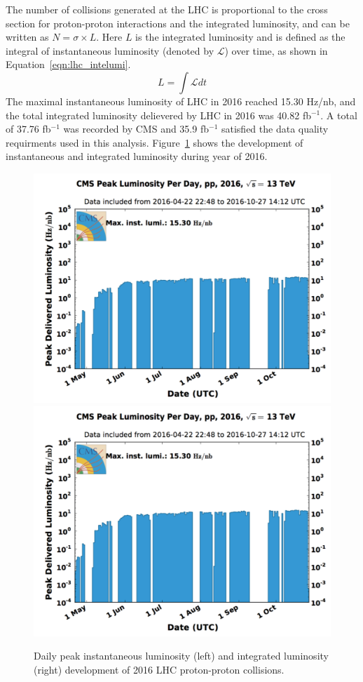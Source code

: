 \vspace{0.3cm}
The number of collisions generated at the LHC is proportional to the cross section for proton-proton interactions and the integrated luminosity, and can be written as $N=\sigma \times L$. Here $L$ is the integrated luminosity and is defined as the integral of instantaneous luminosity (denoted by $\mathcal{L}$) over time, as shown in Equation~\ref{eqn:lhc_intelumi}.
\begin{equation}
L=\int \mathcal{L}dt
\label{eqn:lhc_intelumi}
\end{equation}
The maximal instantaneous luminosity of LHC in 2016 reached 15.30 Hz/nb, and the total integrated luminosity delievered by LHC in 2016 was 40.82 fb$^{-1}$. A total of 37.76 fb$^{-1}$ was recorded by CMS and 35.9 fb$^{-1}$ satisfied the data quality requirments used in this analysis. Figure~\ref{fig:lhc_lumi2016} shows the development of instantaneous and integrated luminosity during year of 2016.

\begin{figure}[htbp]
\begin{center}
\includegraphics[width=0.49\linewidth, page=1]{figures/lhc_lumi2016.pdf}
\includegraphics[width=0.49\linewidth, page=2]{figures/lhc_lumi2016.pdf}
\caption{Daily peak instantaneous luminosity (left) and integrated luminosity (right) development of 2016 LHC proton-proton collisions.}
\label{fig:lhc_lumi2016}
\end{center}
\end{figure}

